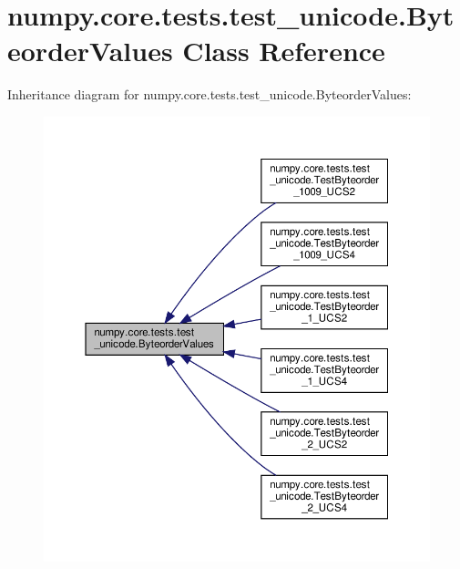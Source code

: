 \hypertarget{classnumpy_1_1core_1_1tests_1_1test__unicode_1_1ByteorderValues}{}\section{numpy.\+core.\+tests.\+test\+\_\+unicode.\+Byteorder\+Values Class Reference}
\label{classnumpy_1_1core_1_1tests_1_1test__unicode_1_1ByteorderValues}


Inheritance diagram for numpy.\+core.\+tests.\+test\+\_\+unicode.\+Byteorder\+Values\+:
\nopagebreak
\begin{figure}[H]
\begin{center}
\leavevmode
\includegraphics[width=350pt]{classnumpy_1_1core_1_1tests_1_1test__unicode_1_1ByteorderValues__inherit__graph}
\end{center}
\end{figure}

